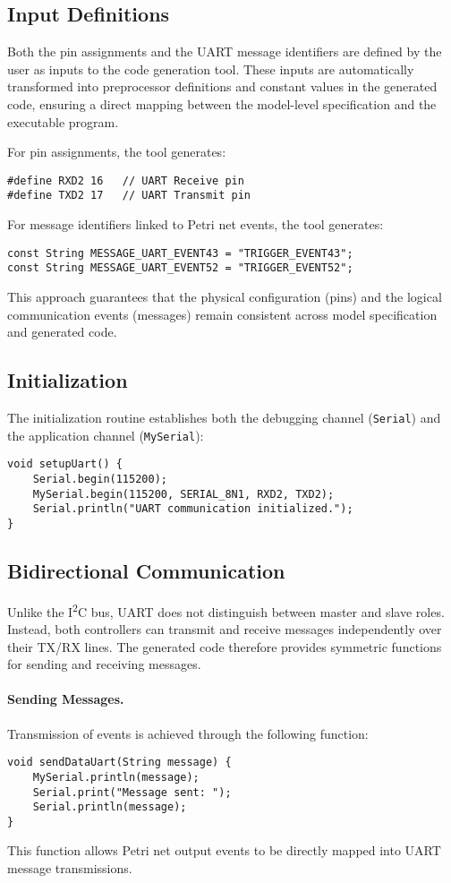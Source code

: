 \subsection{Input Definitions}
Both the pin assignments and the UART message identifiers are defined by the user as inputs to the code generation tool. These inputs are automatically transformed into preprocessor definitions and constant values in the generated code, ensuring a direct mapping between the model-level specification and the executable program.

\noindent
For pin assignments, the tool generates:
\begin{verbatim}
#define RXD2 16   // UART Receive pin
#define TXD2 17   // UART Transmit pin
\end{verbatim}

\noindent
For message identifiers linked to Petri net events, the tool generates:
\begin{verbatim}
const String MESSAGE_UART_EVENT43 = "TRIGGER_EVENT43";
const String MESSAGE_UART_EVENT52 = "TRIGGER_EVENT52";
\end{verbatim}

\noindent
This approach guarantees that the physical configuration (pins) and the logical communication events (messages) remain consistent across model specification and generated code.

\subsection{Initialization}
The initialization routine establishes both the debugging channel (\texttt{Serial}) and the application channel (\texttt{MySerial}):
\begin{verbatim}
void setupUart() {
    Serial.begin(115200);
    MySerial.begin(115200, SERIAL_8N1, RXD2, TXD2);
    Serial.println("UART communication initialized.");
}
\end{verbatim}

\subsection{Bidirectional Communication}
Unlike the I\textsuperscript{2}C bus, UART does not distinguish between master and slave roles. Instead, both controllers can transmit and receive messages independently over their TX/RX lines. The generated code therefore provides symmetric functions for sending and receiving messages.

\paragraph{Sending Messages.}  
Transmission of events is achieved through the following function:
\begin{verbatim}
void sendDataUart(String message) {
    MySerial.println(message);
    Serial.print("Message sent: ");
    Serial.println(message);
}
\end{verbatim}
This function allows Petri net output events to be directly mapped into UART message transmissions.

